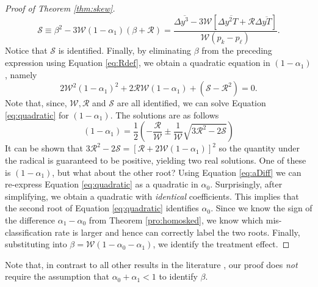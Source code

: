 \begin{proof}[Proof of Theorem \ref{thm:skew}]
  \begin{equation}
    \mathcal{S} \equiv \beta^2 - 3\mathcal{W}(1-\alpha_1) (\beta + \mathcal{R}) = \frac{\Delta\overline{y^3} - 3 \mathcal{W}\left[ \Delta\overline{y^2T}+\mathcal{R}\Delta\overline{yT} \right]}{\mathcal{W}(p_k - p_\ell)}.
    \label{eq:Sdef}
  \end{equation}
  Notice that $\mathcal{S}$ is identified.
  Finally, by eliminating $\beta$ from the preceding expression using Equation \ref{eq:Rdef}, we obtain a quadratic equation in $(1-\alpha_1)$, namely 
  \begin{equation}
    2\mathcal{W}^2 (1-\alpha_1)^2 + 2 \mathcal{R}\mathcal{W} (1-\alpha_1) + (\mathcal{S} -\mathcal{R}^2) = 0.
    \label{eq:quadratic}
  \end{equation}
  Note that, since, $\mathcal{W}, \mathcal{R}$ and $\mathcal{S}$ are all identified, we can solve Equation \ref{eq:quadratic} for $(1-\alpha_1)$.
The solutions are as follows
\begin{equation}
  (1 - \alpha_1) = \frac{1}{2} \left( -\frac{\mathcal{R}}{\mathcal{W}} \pm  \frac{1}{\mathcal{W}}\sqrt{3\mathcal{R}^2 - 2 \mathcal{S}}\right)
  \label{eq:quadsolutions}
\end{equation}
It can be shown that $3\mathcal{R}^2 - 2\mathcal{S} = \left[ \mathcal{R} + 2 \mathcal{W}(1-\alpha_1) \right]^2$ so the quantity under the radical is guaranteed to be positive, yielding two real solutions.
One of these is $(1-\alpha_1)$, but what about the other root?
Using Equation \ref{eq:aDiff} we can re-express Equation \ref{eq:quadratic} as a quadratic in $\alpha_0$.
Surprisingly, after simplifying, we obtain a quadratic with \emph{identical} coefficients.
This implies that the second root of Equation \ref{eq:quadratic} identifies $\alpha_0$.
Since we know the sign of the difference $\alpha_1 - \alpha_0$ from Theorem \ref{pro:homosked}, we know which mis-classification rate is larger and hence can correctly label the two roots.
Finally, substituting into $\beta = \mathcal{W}(1-\alpha_0-\alpha_1)$, we identify the treatment effect.
\end{proof}

Note that, in contrast to all other results in the literature \citep{KRS, BBS, FL, Mahajan, Lewbel}, our proof does \emph{not} require the assumption that $\alpha_0 + \alpha_1 <1$ to identify $\beta$.


